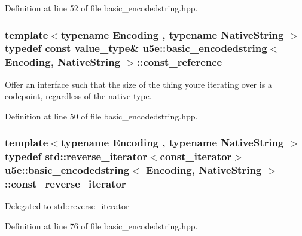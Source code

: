 Definition at line 52 of file basic\+\_\+encodedstring.\+hpp.

\subsubsection[{\texorpdfstring{const\+\_\+reference}{const_reference}}]{\setlength{\rightskip}{0pt plus 5cm}template$<$typename Encoding , typename Native\+String $>$ typedef const {\bf value\+\_\+type}\& {\bf u5e\+::basic\+\_\+encodedstring}$<$ Encoding, Native\+String $>$\+::{\bf const\+\_\+reference}}\hypertarget{classu5e_1_1basic__encodedstring_a4652a99a020af37293ab37f638282832}{}\label{classu5e_1_1basic__encodedstring_a4652a99a020af37293ab37f638282832}
Offer an interface such that the size of the thing you\textquotesingle{}re iterating over is a codepoint, regardless of the native type. 

Definition at line 50 of file basic\+\_\+encodedstring.\+hpp.

\subsubsection[{\texorpdfstring{const\+\_\+reverse\+\_\+iterator}{const_reverse_iterator}}]{\setlength{\rightskip}{0pt plus 5cm}template$<$typename Encoding , typename Native\+String $>$ typedef std\+::reverse\+\_\+iterator$<${\bf const\+\_\+iterator}$>$ {\bf u5e\+::basic\+\_\+encodedstring}$<$ Encoding, Native\+String $>$\+::{\bf const\+\_\+reverse\+\_\+iterator}}\hypertarget{classu5e_1_1basic__encodedstring_afaaf9b36cd1b6ad6821450e5445e32fd}{}\label{classu5e_1_1basic__encodedstring_afaaf9b36cd1b6ad6821450e5445e32fd}
Delegated to std\+::reverse\+\_\+iterator 

Definition at line 76 of file basic\+\_\+encodedstring.\+hpp.

